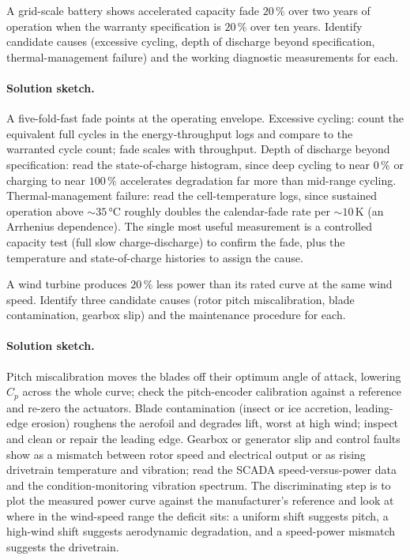 \begin{exercise}
A grid-scale battery shows accelerated capacity fade $20\,\%$ over
two years of operation when the warranty specification is $20\,\%$
over ten years. Identify candidate causes (excessive cycling, depth
of discharge beyond specification, thermal-management failure) and
the working diagnostic measurements for each.
\paragraph{Solution sketch.}
A five-fold-fast fade points at the operating envelope. Excessive
cycling: count the equivalent full cycles in the energy-throughput logs
and compare to the warranted cycle count; fade scales with throughput.
Depth of discharge beyond specification: read the state-of-charge
histogram, since deep cycling to near $0\,\%$ or charging to near
$100\,\%$ accelerates degradation far more than mid-range cycling.
Thermal-management failure: read the cell-temperature logs, since
sustained operation above $\sim 35\,\si{\celsius}$ roughly doubles the
calendar-fade rate per $\sim 10\,\si{\kelvin}$ (an Arrhenius
dependence). The single most useful measurement is a controlled
capacity test (full slow charge-discharge) to confirm the fade, plus
the temperature and state-of-charge histories to assign the cause.
\end{exercise}

\begin{exercise}
A wind turbine produces $20\,\%$ less power than its rated curve at
the same wind speed. Identify three candidate causes (rotor pitch
miscalibration, blade contamination, gearbox slip) and the
maintenance procedure for each.
\paragraph{Solution sketch.}
Pitch miscalibration moves the blades off their optimum angle of
attack, lowering $C_p$ across the whole curve; check the pitch-encoder
calibration against a reference and re-zero the actuators. Blade
contamination (insect or ice accretion, leading-edge erosion)
roughens the aerofoil and degrades lift, worst at high wind; inspect
and clean or repair the leading edge. Gearbox or generator slip and
control faults show as a mismatch between rotor speed and electrical
output or as rising drivetrain temperature and vibration; read the
SCADA speed-versus-power data and the condition-monitoring vibration
spectrum. The discriminating step is to plot the measured power curve
against the manufacturer's reference and look at where in the
wind-speed range the deficit sits: a uniform shift suggests pitch, a
high-wind shift suggests aerodynamic degradation, and a speed-power
mismatch suggests the drivetrain.
\end{exercise}

